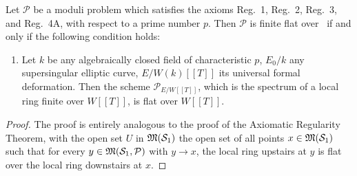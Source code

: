 \begin{afft}\label{thm:6.8.2}
Let $\mathcal{P}$ be a moduli problem which satisfies the axioms Reg.~1, Reg.~2, Reg.~3, and Reg.~4A, with respect to a prime number $p$. Then $\mathcal{P}$ is finite flat over \Ell\ if and only if the following condition holds:
\begin{enumerate}[(FF)]
\item Let $k$ be any algebraically closed field of characteristic $p$, $E_0/k$ any supersingular elliptic curve, $E/W(k)[[T]]$ its universal formal deformation. Then the scheme $\mathcal{P}_{E/W[[T]]}$, which is the spectrum of a local ring finite over $W[[T]]$, is flat over $W[[T]]$.
\end{enumerate}
\end{afft}

\begin{proof}
The proof is entirely analogous to the proof of the Axiomatic Regularity Theorem, with the open set $U$ in $\mathfrak{M}(\mathcal{S}_1)$ the open set of all points $x \in \mathfrak{M}(\mathcal{S}_1)$ such that for every $y \in \mathfrak{M}(\mathcal{S}_1, \mathcal{P})$ with $y \to x$, the local ring upstairs at $y$ is flat over the local ring downstairs at $x$.
\end{proof}

